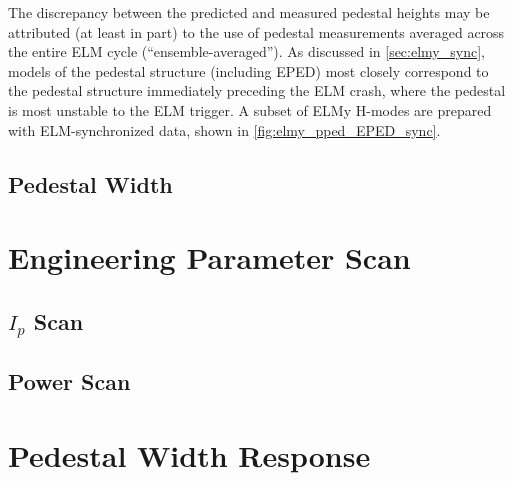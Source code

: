The discrepancy between the predicted and measured pedestal heights may be attributed (at least in part) to the use of pedestal measurements averaged across the entire ELM cycle (``ensemble-averaged'').  As discussed in \cref{sec:elmy_sync}, models of the pedestal structure (including EPED) most closely correspond to the pedestal structure immediately preceding the ELM crash, where the pedestal is most unstable to the ELM trigger.  A subset of ELMy H-modes are prepared with ELM-synchronized data, shown in \cref{fig:elmy_pped_EPED_sync}.

\begin{figure}[ht]
 \pushtooutside
\end{figure}


\subsection{Pedestal Width}\label{subsec:elmy_eped_width}

\nicesectionending

\section{Engineering Parameter Scan}\label{sec:elmy_engineer}

\subsection{$I_p$ Scan}\label{subsec:elmy_ip}

\subsection{Power Scan}\label{subsec:elmy_power}

\nicesectionending

\section{Pedestal Width Response}\label{sec:elmy_width}

\nicechapterending


